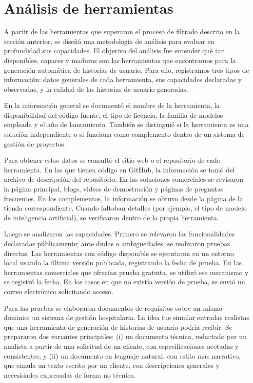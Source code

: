 \section{Análisis de herramientas}

A partir de las herramientas que superaron el proceso de filtrado descrito en la sección anterior, se diseñó una metodología de análisis para evaluar en profundidad sus capacidades. El objetivo del análisis fue entender qué tan disponibles, capaces y maduras son las herramientas que encontramos para la generación automática de historias de usuario. Para ello, registramos tres tipos de información: datos generales de cada herramienta, sus capacidades declaradas y observadas, y la calidad de las historias de usuario generadas.

En la información general se documentó el nombre de la herramienta, la disponibilidad del código fuente, el tipo de licencia, la familia de modelos empleada y el año de lanzamiento. También se distinguió si la herramienta es una solución independiente o si funciona como complemento dentro de un sistema de gestión de proyectos.

Para obtener estos datos se consultó el sitio web o el repositorio de cada herramienta. En las que tienen código en GitHub, la información se tomó del archivo de descripción del repositorio. En las soluciones comerciales se revisaron la página principal, blogs, videos de demostración y páginas de preguntas frecuentes. En los complementos, la información se obtuvo desde la página de la tienda correspondiente. Cuando faltaban detalles (por ejemplo, el tipo de modelo de inteligencia artificial), se verificaron dentro de la propia herramienta.

Luego se analizaron las capacidades. Primero se relevaron las funcionalidades declaradas públicamente; ante dudas o ambigüedades, se realizaron pruebas directas. Las herramientas con código disponible se ejecutaron en un entorno local usando la última versión publicada, registrando la fecha de prueba. En las herramientas comerciales que ofrecían prueba gratuita, se utilizó ese mecanismo y se registró la fecha. En los casos en que no existía versión de prueba, se envió un correo electrónico solicitando acceso.

Para las pruebas se elaboraron documentos de requisitos sobre un mismo dominio: un sistema de gestión hospitalaria. La idea fue simular entradas realistas que una herramienta de generación de historias de usuario podría recibir. Se prepararon dos variantes principales: (i) un documento técnico, redactado por un analista a partir de una solicitud de un cliente, con especificaciones acotadas y consistentes; y (ii) un documento en lenguaje natural, con estilo más narrativo, que simula un texto escrito por un cliente, con descripciones generales y necesidades expresadas de forma no técnica.

